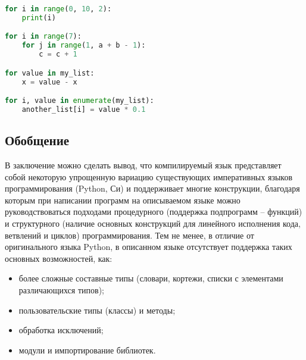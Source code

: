 \begin{lstlisting}[language=Python, caption=Примеры циклов со счетчиком]
for i in range(0, 10, 2):
    print(i)

for i in range(7):
    for j in range(1, a + b - 1):
        c = c + 1

for value in my_list:
    x = value - x

for i, value in enumerate(my_list):
    another_list[i] = value * 0.1
\end{lstlisting}

\subsection{Обобщение}

В заключение можно сделать вывод, что компилируемый язык представляет собой некоторую упрощенную вариацию существующих императивных языков программирования (Python, Си) и поддерживает многие конструкции, благодаря которым при написании программ на описываемом языке можно руководствоваться подходами процедурного (поддержка подпрограмм -- функций) и структурного (наличие основных конструкций для линейного исполнения кода, ветвлений и циклов) программирования.
Тем не менее, в отличие от оригинального языка Python, в описанном языке отсутствует поддержка таких основных возможностей, как:

\begin{itemize}
    \item более сложные составные типы (словари, кортежи, списки с элементами различающихся типов);
    \item пользовательские типы (классы) и методы;
    \item обработка исключений;
    \item модули и импортирование библиотек.
\end{itemize}
